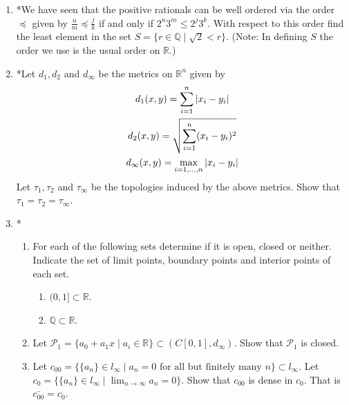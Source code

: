 \documentclass[notoc,notitlepage]{tufte-book}
\begin{document}
\begin{enumerate}
  \item *We have seen that the positive rationals can be well ordered via the order $\preceq$ given by $\frac{n}{m} \preceq \frac{j}{k}$ if and only if $2^n 3^m \leq 2^j 3^k$. With respect to this order find the least element in the set $S = \{ r \in \mathbb{Q} \mid \sqrt{2} < r \}$. (Note: In defining $S$ the order we use is the usual order on $\mathbb{R}$.)

  \item *Let $d_1, d_2$ and $d_\infty$ be the metrics on $\mathbb{R}^n$ given by
    \begin{gather*}
      d_1(x, y)      = \sum_{i = 1}^{n} \left| x_i - y_i \right| \\
      d_2(x, y)      = \sqrt{\sum_{i = 1}^{n} (x_i - y_i)^2 } \\
      d_\infty(x, y) = \max_{i = 1, \ldots, n} \left|x_i - y_i\right|
    \end{gather*}
    Let $\tau_1, \tau_2$ and $\tau_\infty$ be the topologies induced by the above metrics. Show that $\tau_1 = \tau_2 = \tau_\infty$.

  \item *\begin{enumerate}
    \item For each of the following sets determine if it is open, closed or neither. Indicate the set of limit points, boundary points and interior points of each set.
      \begin{enumerate}
        \item $(0, 1] \subset \mathbb{R}$.
        \item $\mathbb{Q} \subset \mathbb{R}$.
      \end{enumerate}
    \item Let $\mathcal{P}_1 = \{ a_0 + a_1 x \mid a_i \in \mathbb{R} \} \subset (C[0, 1], d_\infty)$. Show that $\mathcal{P}_1$ is closed.
    \item Let $c_{00} = \{ \{ a_n \} \in l_\infty \mid a_n = 0 \text{ for all but finitely many } n \} \subset l_\infty$. Let $c_0 = \{ \{ a_n \} \in l_\infty \mid \lim_{n \to \infty} a_n = 0 \}$. Show that $c_{00}$ is dense in $c_0$. That is $\bar{c_{00}} = c_0$.
  \end{enumerate}


\end{enumerate}
\end{document}
